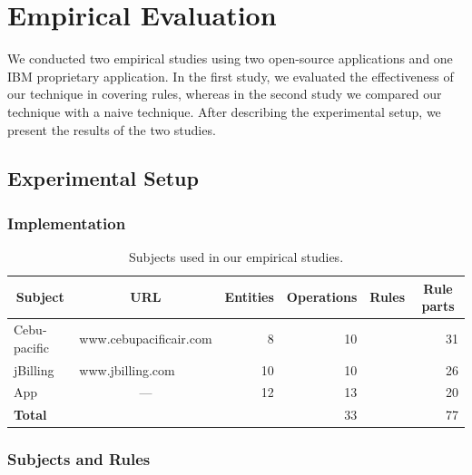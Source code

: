 \section{Empirical Evaluation}
\label{sec:eval}


We conducted two empirical studies using two open-source applications 
and one IBM proprietary application. In the first study, we evaluated the
effectiveness of our technique in covering rules, whereas in the second study
we compared our technique with a naive technique. After describing the experimental setup,
we present the results of the two studies.

\subsection{Experimental Setup}

\subsubsection{Implementation}


\begin{table}[t]
\caption{Subjects used in our empirical studies.}
\vspace*{-2ex}
\centering
{\scriptsize
\tabcolsep=3pt
\begin{tabular}{|l|l|r|r|r|r|}
\hline
\multicolumn{1}{|c|}{Subject} & \multicolumn{1}{|c|}{URL} & \multicolumn{1}{|c|}{Entities} & \multicolumn{1}{|c|}{Operations} & \multicolumn{1}{|c|}{Rules} & \multicolumn{1}{|c|}{Rule parts} \\
\hline \hline
Cebu-pacific & www.cebupacificair.com 		& 8  & 10 &  	 & 31 \\
jBilling 		 & www.jbilling.com 					& 10 & 10 &   	 & 26 \\
App 				 & \multicolumn{1}{|c|}{---}	& 12 & 13 &     & 20 \\
\hline \hline
\textbf{Total} & 													& 	 & 33 &     & 77 \\
\hline
\end{tabular}
}
\label{tab:subjects}
\end{table}

\subsubsection{Subjects and Rules}

